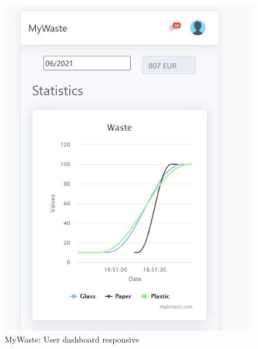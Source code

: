 \documentclass{report}
\begin{document}
\begin{figure}[h!]
    \begin{center}
        \includegraphics[width=1.0\textwidth]{images/userDashboard_resp1.PNG}  \end{center}
    \caption{MyWaste: User dashboard responsive}
    \label{fig:respuserdash1}
\end{figure}
\end{document}

